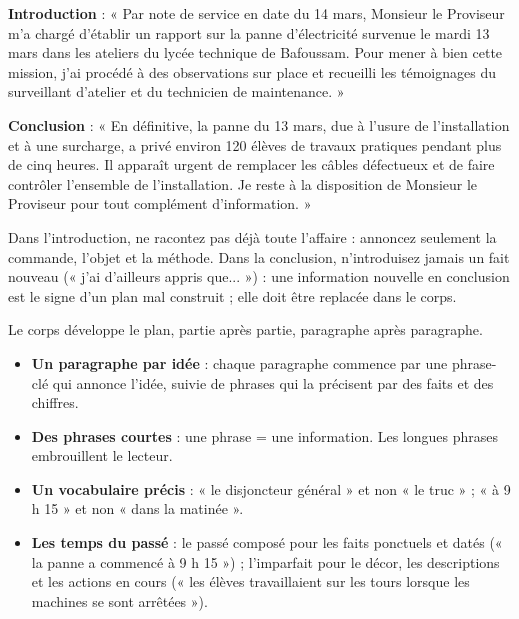 \documentclass[11pt]{article}
\newcommand{\cle}[1]{{\popxbold\color{popdark}#1}}
\newcounter{popsec}
\newcounter{popsub}
\newcommand{\courssub}[1]{%
  \stepcounter{popsub}%
  \par\vspace{9pt}\noindent{\popxbold\fontsize{11.5}{13}\selectfont\color{popink}{\color{poporange}\thepopsec.\thepopsub}\hspace{6pt}#1}\par\nopagebreak\vspace{4pt}
}
\begin{document}
\begin{exemplebox}
\textbf{Introduction} : « Par note de service en date du 14 mars, Monsieur le Proviseur m'a chargé d'établir un rapport sur la panne d'électricité survenue le mardi 13 mars dans les ateliers du lycée technique de Bafoussam. Pour mener à bien cette mission, j'ai procédé à des observations sur place et recueilli les témoignages du surveillant d'atelier et du technicien de maintenance. »

\textbf{Conclusion} : « En définitive, la panne du 13 mars, due à l'usure de l'installation et à une surcharge, a privé environ 120 élèves de travaux pratiques pendant plus de cinq heures. Il apparaît urgent de remplacer les câbles défectueux et de faire contrôler l'ensemble de l'installation. Je reste à la disposition de Monsieur le Proviseur pour tout complément d'information. »
\end{exemplebox}

\begin{attention}
Dans l'introduction, ne racontez pas déjà toute l'affaire : annoncez seulement la commande, l'objet et la méthode. Dans la conclusion, n'introduisez jamais un fait nouveau (« j'ai d'ailleurs appris que... ») : une information nouvelle en conclusion est le signe d'un plan mal construit ; elle doit être replacée dans le corps.
\end{attention}

\courssub{Rédiger le corps du rapport}

Le corps développe le plan, partie après partie, paragraphe après paragraphe.

\begin{propriete}
\begin{itemize}
\item \textbf{Un paragraphe par idée} : chaque paragraphe commence par une phrase-clé qui annonce l'idée, suivie de phrases qui la précisent par des faits et des chiffres.
\item \textbf{Des phrases courtes} : une phrase = une information. Les longues phrases embrouillent le lecteur.
\item \textbf{Un vocabulaire précis} : « le disjoncteur général » et non « le truc » ; « à 9 h 15 » et non « dans la matinée ».
\item \textbf{Les temps du passé} : le \cle{passé composé} pour les faits ponctuels et datés (« la panne a commencé à 9 h 15 ») ; l'\cle{imparfait} pour le décor, les descriptions et les actions en cours (« les élèves travaillaient sur les tours lorsque les machines se sont arrêtées »).
\end{itemize}
\end{propriete}
\end{document}
